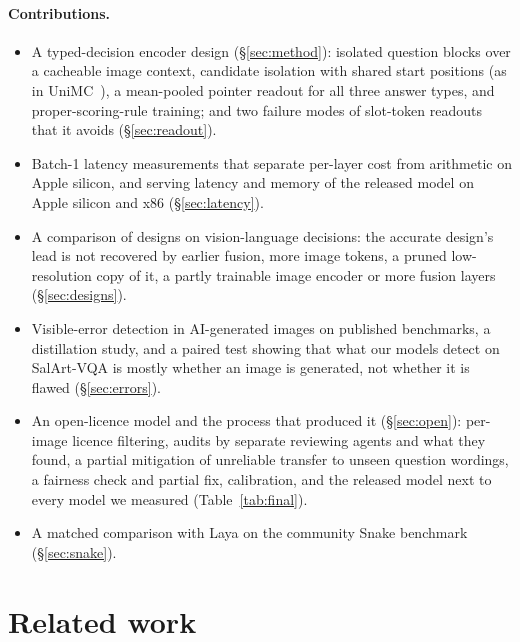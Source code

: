\documentclass[10pt]{article}
\begin{document}
\paragraph{Contributions.}
\begin{itemize}\setlength\itemsep{1pt}
\item A typed-decision encoder design (\S\ref{sec:method}): isolated question blocks over a cacheable image context, candidate isolation with shared start positions (as in UniMC~\cite{unimc}), a mean-pooled pointer readout for all three answer types, and proper-scoring-rule training; and two failure modes of slot-token readouts that it avoids (\S\ref{sec:readout}).
\item Batch-1 latency measurements that separate per-layer cost from arithmetic on Apple silicon, and serving latency and memory of the released model on Apple silicon and x86 (\S\ref{sec:latency}).
\item A comparison of designs on vision-language decisions: the accurate design's lead is not recovered by earlier fusion, more image tokens, a pruned low-resolution copy of it, a partly trainable image encoder or more fusion layers (\S\ref{sec:designs}).
\item Visible-error detection in AI-generated images on published benchmarks, a distillation study, and a paired test showing that what our models detect on SalArt-VQA is mostly whether an image is generated, not whether it is flawed (\S\ref{sec:errors}).
\item An open-licence model and the process that produced it (\S\ref{sec:open}): per-image licence filtering, audits by separate reviewing agents and what they found, a partial mitigation of unreliable transfer to unseen question wordings, a fairness check and partial fix, calibration, and the released model next to every model we measured (Table~\ref{tab:final}).
\item A matched comparison with Laya on the community Snake benchmark (\S\ref{sec:snake}).
\end{itemize}

\section{Related work}
\end{document}
